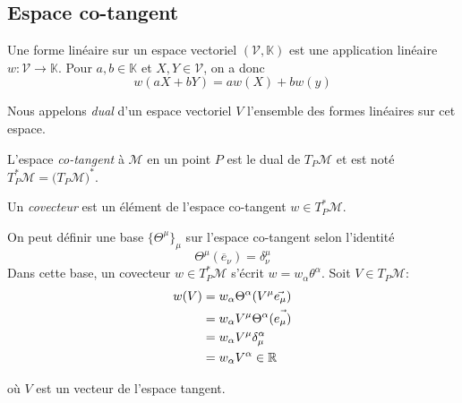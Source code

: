 \subsection{Espace co-tangent}
\begin{theoremframe}
    \begin{defi}
        Une forme linéaire sur un espace vectoriel $(\mathcal{V},\mathbb{K})$ est une application linéaire $w:\mathcal{V} \to \mathbb{K}$. Pour $a,b\in \mathbb{K}$ et $X,Y \in \mathcal{V}$, on a donc
        \begin{equation}
            w(aX+bY) = aw(X)+bw(y)
        \end{equation}
    \end{defi}
\end{theoremframe}
Nous appelons \textit{dual} d'un espace vectoriel $V$ l'ensemble des formes linéaires sur cet espace.
\begin{theoremframe}
    \begin{defi}
        L'espace \textit{co-tangent} à $\mathcal{M}$ en un point $P$ est le dual de $T_P\mathcal{M}$ et est noté $T_P^*\mathcal{M} = (T_P\mathcal{M)^*}$.
    \end{defi}
\end{theoremframe}
\begin{theoremframe}
    \begin{defi}
        Un \textit{covecteur} est un élément de l'espace co-tangent $w\in T_P^*\mathcal{M}$.
    \end{defi}
\end{theoremframe}
On peut définir une base $\{\Theta^\mu\}_\mu$ sur l'espace co-tangent selon l'identité
\begin{equation}
    \Theta^\mu(\overline{e}_\nu)=\delta^\mu_\nu
\end{equation}
Dans cette base, un covecteur $w\in T_P^*\mathcal{M}$ s'écrit $w = w_\alpha \theta^\alpha$. Soit $V \in T_P\mathcal{M}$:
\begin{align}
    w(V) &= w_{\alpha} \Theta^{\alpha}(V^{\mu} \Vec{e_{\mu}})\\
    &=w_{\alpha} V^{\mu}\Theta^{\alpha} (\Vec{e_{\mu})}\\
    &= w_{\alpha} V^{\mu}\delta^{\alpha}_{\mu}\\
    &= w_{\alpha} V^{\alpha} \in \mathbb{R}
\end{align}


où $V$ est un vecteur de l'espace tangent. 

